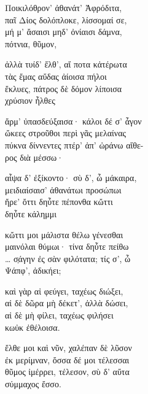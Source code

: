 \begin{gkverse}
Ποικιλόθρον’ ἀθανάτ’ Ἀφρόδιτα,\\
παῖ Δίος δολόπλοκε, λίσσομαί σε,\\
μή μ’ ἄσαισι μηδ’ ὀνίαισι δάμνα,\\
	πότνια, θῦμον,

ἀλλὰ τυίδ’ ἔλθ’, αἴ ποτα κἀτέρωτα\\
τὰς ἔμας αὔδας ἀίοισα πήλοι\\
ἔκλυες, πάτρος δὲ δόμον λίποισα\\
	χρύσιον ἦλθες

ἄρμ’ ὐπασδεύξαισα· κάλοι δέ σ’ ἆγον\\
ὤκεες στροῦθοι περὶ γᾶς μελαίνας\\
πύκνα δίννεντες πτέρ’ ἀπ’ ὠράνω αἴθε-\\
ρος διὰ μέσσω·

αἶψα δ’ ἐξίκοντο· σὺ δ’, ὦ μάκαιρα,\\
μειδιαίσαισ’ ἀθανάτωι προσώπωι\\
ἤρε’ ὄττι δηὖτε πέπονθα κὤττι\\
δηὖτε κάλημμι

κὤττι μοι μάλιστα θέλω γένεσθαι\\
μαινόλαι θύμωι· τίνα δηὖτε πείθω\\
\ldots{} σ̣άγην ἐς σὰν φιλότατα; τίς σ’, ὦ\\
Ψάπφ’, ἀδικήει;

καὶ γὰρ αἰ φεύγει, ταχέως διώξει,\\
αἰ δὲ δῶρα μὴ δέκετ’, ἀλλὰ δώσει,\\
αἰ δὲ μὴ φίλει, ταχέως φιλήσει\\
κωὐκ ἐθέλοισα.

ἔλθε μοι καὶ νῦν, χαλέπαν δὲ λῦσον\\
ἐκ μερίμναν, ὄσσα δέ μοι τέλεσσαι\\
θῦμος ἰμέρρει, τέλεσον, σὺ δ’ αὔτα\\
σύμμαχος ἔσσο. 
\end{gkverse}

\pagebreak
\section*{}

